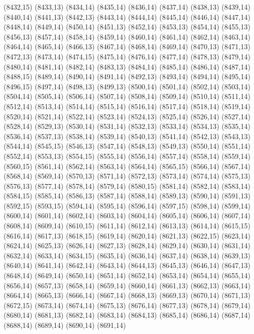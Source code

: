 (8432,15)
(8433,13)
(8434,14)
(8435,14)
(8436,14)
(8437,14)
(8438,13)
(8439,14)
(8440,14)
(8441,13)
(8442,13)
(8443,14)
(8444,14)
(8445,14)
(8446,14)
(8447,14)
(8448,14)
(8449,14)
(8450,14)
(8451,13)
(8452,14)
(8453,13)
(8454,14)
(8455,13)
(8456,13)
(8457,14)
(8458,14)
(8459,14)
(8460,14)
(8461,14)
(8462,14)
(8463,14)
(8464,14)
(8465,14)
(8466,13)
(8467,14)
(8468,14)
(8469,14)
(8470,13)
(8471,13)
(8472,13)
(8473,14)
(8474,15)
(8475,14)
(8476,14)
(8477,14)
(8478,13)
(8479,14)
(8480,14)
(8481,14)
(8482,14)
(8483,13)
(8484,14)
(8485,14)
(8486,14)
(8487,14)
(8488,15)
(8489,14)
(8490,14)
(8491,14)
(8492,13)
(8493,14)
(8494,14)
(8495,14)
(8496,15)
(8497,14)
(8498,13)
(8499,13)
(8500,14)
(8501,14)
(8502,14)
(8503,14)
(8504,14)
(8505,14)
(8506,14)
(8507,14)
(8508,14)
(8509,14)
(8510,14)
(8511,14)
(8512,14)
(8513,14)
(8514,14)
(8515,14)
(8516,14)
(8517,14)
(8518,14)
(8519,14)
(8520,14)
(8521,14)
(8522,14)
(8523,14)
(8524,13)
(8525,14)
(8526,14)
(8527,14)
(8528,14)
(8529,13)
(8530,14)
(8531,14)
(8532,13)
(8533,14)
(8534,13)
(8535,14)
(8536,14)
(8537,13)
(8538,14)
(8539,14)
(8540,13)
(8541,14)
(8542,13)
(8543,13)
(8544,14)
(8545,15)
(8546,13)
(8547,14)
(8548,13)
(8549,13)
(8550,14)
(8551,14)
(8552,14)
(8553,13)
(8554,15)
(8555,14)
(8556,14)
(8557,14)
(8558,14)
(8559,14)
(8560,15)
(8561,14)
(8562,14)
(8563,14)
(8564,14)
(8565,15)
(8566,14)
(8567,14)
(8568,14)
(8569,14)
(8570,13)
(8571,14)
(8572,13)
(8573,14)
(8574,14)
(8575,13)
(8576,13)
(8577,14)
(8578,14)
(8579,14)
(8580,15)
(8581,14)
(8582,14)
(8583,14)
(8584,15)
(8585,14)
(8586,13)
(8587,14)
(8588,14)
(8589,13)
(8590,14)
(8591,13)
(8592,15)
(8593,15)
(8594,14)
(8595,14)
(8596,14)
(8597,15)
(8598,14)
(8599,14)
(8600,14)
(8601,14)
(8602,14)
(8603,14)
(8604,14)
(8605,14)
(8606,14)
(8607,14)
(8608,14)
(8609,14)
(8610,15)
(8611,14)
(8612,14)
(8613,13)
(8614,14)
(8615,15)
(8616,14)
(8617,13)
(8618,15)
(8619,14)
(8620,14)
(8621,13)
(8622,15)
(8623,14)
(8624,14)
(8625,13)
(8626,14)
(8627,13)
(8628,14)
(8629,14)
(8630,14)
(8631,14)
(8632,14)
(8633,14)
(8634,15)
(8635,14)
(8636,14)
(8637,14)
(8638,14)
(8639,13)
(8640,14)
(8641,14)
(8642,14)
(8643,14)
(8644,13)
(8645,13)
(8646,14)
(8647,13)
(8648,14)
(8649,14)
(8650,14)
(8651,14)
(8652,14)
(8653,14)
(8654,14)
(8655,14)
(8656,14)
(8657,13)
(8658,14)
(8659,14)
(8660,14)
(8661,13)
(8662,13)
(8663,14)
(8664,14)
(8665,13)
(8666,14)
(8667,14)
(8668,13)
(8669,13)
(8670,14)
(8671,13)
(8672,15)
(8673,14)
(8674,14)
(8675,13)
(8676,14)
(8677,13)
(8678,14)
(8679,14)
(8680,14)
(8681,13)
(8682,14)
(8683,14)
(8684,13)
(8685,14)
(8686,14)
(8687,14)
(8688,14)
(8689,14)
(8690,14)
(8691,14)
